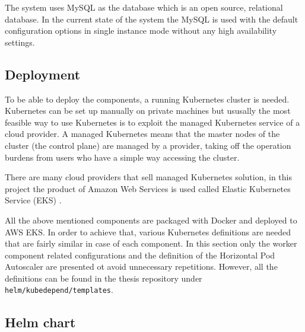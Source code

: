 The system uses MySQL \cite{MySQL} as the database which is an open source, relational database. In the current state of the system the MySQL is used with the default configuration options in single instance mode without any high availability settings.

\subsection{Deployment} \label{sample-app-deployment}


To be able to deploy the components, a running Kubernetes cluster is needed. Kubernetes can be set up manually on private machines but ususally the most feasible way to use Kubernetes is to exploit the managed Kubernetes service of a cloud provider. A managed Kubernetes means that the master nodes of the cluster (the control plane) are managed by a provider, taking off the operation burdens from users who have a simple way accessing the cluster.

There are many cloud providers that sell managed Kubernetes solution, in this project the product of Amazon Web Services is used called Elastic Kubernetes Service (EKS) \cite{EKS}.

All the above mentioned components are packaged with Docker and deployed to AWS EKS. In order to achieve that, various Kubernetes definitions are needed that are fairly similar in case of each component. In this section only the worker component related configurations and the definition of the Horizontal Pod Autoscaler are presented ot avoid unnecessary repetitions. However, all the definitions can be found in the thesis repository \cite{ThesisRepo} under \texttt{helm/kubedepend/templates}.

\subsection{Helm chart}

